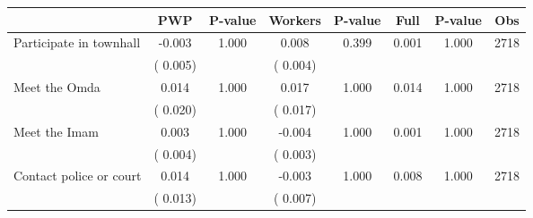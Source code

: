 
\begin{tabular}{l*{7}{c}}\hline&\multicolumn{1}{c}{PWP}&\multicolumn{1}{c}{P-value}&\multicolumn{1}{c}{Workers}&\multicolumn{1}{c}{P-value}&\multicolumn{1}{c}{Full}&\multicolumn{1}{c}{P-value}&\multicolumn{1}{c}{Obs} \\ \hline

 Participate in townhall       &             -0.003       &        1.000  &              0.008       &        0.399  &              0.001       &              1.000 &  2718 \\ 
                       &       (       0.005)             &                               &       (       0.004)                     &                               &                                               &                                &                      \\ 

 Meet the Omda       &              0.014       &        1.000  &              0.017       &        1.000  &              0.014       &              1.000 &  2718 \\ 
                       &       (       0.020)             &                               &       (       0.017)                     &                               &                                               &                                &                      \\ 

 Meet the Imam       &              0.003       &        1.000  &             -0.004       &        1.000  &              0.001       &              1.000 &  2718 \\ 
                       &       (       0.004)             &                               &       (       0.003)                     &                               &                                               &                                &                      \\ 

 Contact police or court       &              0.014       &        1.000  &             -0.003       &        1.000  &              0.008       &              1.000 &  2718 \\ 
                       &       (       0.013)             &                               &       (       0.007)                     &                               &                                               &                                &                      \\ 


\end{tabular}
